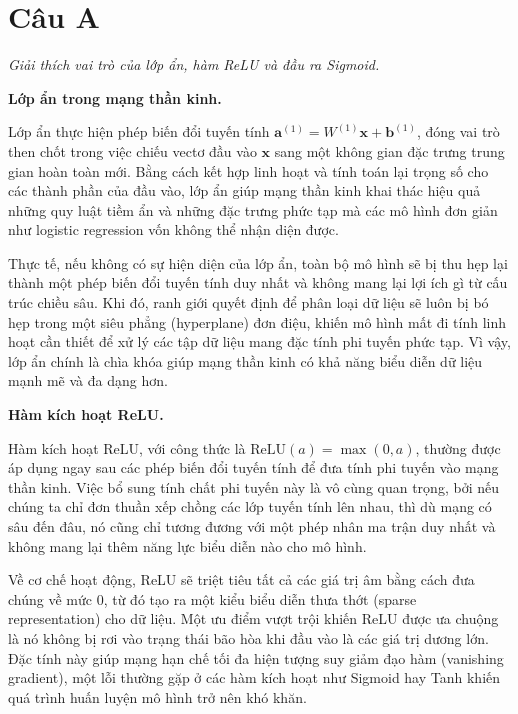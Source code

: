 \documentclass[12pt,a4paper]{article}
\begin{document}
\section*{Câu A}

\noindent\textit{Giải thích vai trò của lớp ẩn, hàm ReLU và đầu ra Sigmoid.}

\medskip

\textbf{Lớp ẩn trong mạng thần kinh.}

Lớp ẩn thực hiện phép biến đổi tuyến tính $\mathbf{a}^{(1)} = W^{(1)}\mathbf{x} + \mathbf{b}^{(1)}$, đóng vai trò then chốt trong việc chiếu vectơ đầu vào $\mathbf{x}$ sang một không gian đặc trưng trung gian hoàn toàn mới. Bằng cách kết hợp linh hoạt và tính toán lại trọng số cho các thành phần của đầu vào, lớp ẩn giúp mạng thần kinh khai thác hiệu quả những quy luật tiềm ẩn và những đặc trưng phức tạp mà các mô hình đơn giản như logistic regression vốn không thể nhận diện được. 

Thực tế, nếu không có sự hiện diện của lớp ẩn, toàn bộ mô hình sẽ bị thu hẹp lại thành một phép biến đổi tuyến tính duy nhất và không mang lại lợi ích gì từ cấu trúc chiều sâu. Khi đó, ranh giới quyết định để phân loại dữ liệu sẽ luôn bị bó hẹp trong một siêu phẳng (hyperplane) đơn điệu, khiến mô hình mất đi tính linh hoạt cần thiết để xử lý các tập dữ liệu mang đặc tính phi tuyến phức tạp. Vì vậy, lớp ẩn chính là chìa khóa giúp mạng thần kinh có khả năng biểu diễn dữ liệu mạnh mẽ và đa dạng hơn.

\medskip

\textbf{Hàm kích hoạt ReLU.}

Hàm kích hoạt ReLU, với công thức là $\text{ReLU}(a) = \max(0, a)$, thường được áp dụng ngay sau các phép biến đổi tuyến tính để đưa tính phi tuyến vào mạng thần kinh. Việc bổ sung tính chất phi tuyến này là vô cùng quan trọng, bởi nếu chúng ta chỉ đơn thuần xếp chồng các lớp tuyến tính lên nhau, thì dù mạng có sâu đến đâu, nó cũng chỉ tương đương với một phép nhân ma trận duy nhất và không mang lại thêm năng lực biểu diễn nào cho mô hình. 

Về cơ chế hoạt động, ReLU sẽ triệt tiêu tất cả các giá trị âm bằng cách đưa chúng về mức $0$, từ đó tạo ra một kiểu biểu diễn thưa thớt (sparse representation) cho dữ liệu. Một ưu điểm vượt trội khiến ReLU được ưa chuộng là nó không bị rơi vào trạng thái bão hòa khi đầu vào là các giá trị dương lớn. Đặc tính này giúp mạng hạn chế tối đa hiện tượng suy giảm đạo hàm (vanishing gradient), một lỗi thường gặp ở các hàm kích hoạt như Sigmoid hay Tanh khiến quá trình huấn luyện mô hình trở nên khó khăn.
\end{document}
